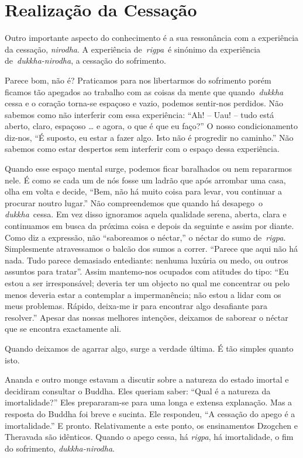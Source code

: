 \section{Realização da Cessação}

Outro importante aspecto do conhecimento é a sua ressonância com a
experiência da cessação, \emph{nirodha}. A experiência de~\emph{rigpa}~é
sinónimo da experiência de~\emph{dukkha-nirodha}, a cessação do
sofrimento.

Parece bom, não é? Praticamos para nos libertarmos do sofrimento porém
ficamos tão apegados ao trabalho com as coisas da mente que
quando~\emph{dukkha} cessa e o coração torna-se espaçoso e vazio,
podemos sentir-nos perdidos. Não sabemos como não interferir com essa
experiência: ``Ah! -- Uau! -- tudo está aberto, claro, espaçoso \ldots{}
e agora, o que é que eu faço?'' O nosso condicionamento diz-nos, ``É
suposto, eu estar a fazer algo. Isto não é progredir no caminho.'' Não
sabemos como estar despertos sem interferir com o espaço dessa
experiência.

Quando esse espaço mental surge, podemos ficar baralhados ou nem
repararmos nele. É como se cada um de nós fosse um ladrão que após
arrombar uma casa, olha em volta e decide, ``Bem, não há muito coisa
para levar, vou continuar a procurar noutro lugar.'' Não compreendemos
que quando há desapego~o \emph{dukkha}~cessa. Em vez disso ignoramos
aquela qualidade serena, aberta, clara e continuamos em busca da próxima
coisa e depois da seguinte e assim por diante. Como diz a expressão, não
``saboreamos o néctar,'' o néctar do sumo de~\emph{rigpa}. Simplesmente
atravessamos o balcão dos sumos a correr. ``Parece que aqui não há nada.
Tudo parece demasiado entediante: nenhuma luxúria ou medo, ou outros
assuntos para tratar''. Assim mantemo-nos ocupados com atitudes do tipo:
``Eu estou a ser irresponsável; deveria ter um objecto no qual me
concentrar ou pelo menos deveria estar a contemplar a impermanência; não
estou a lidar com os meus problemas. Rápido, deixa-me ir para encontrar
algo desafiante para resolver.'' Apesar das nossas melhores intenções,
deixamos de saborear o néctar que se encontra exactamente ali.

Quando deixamos de agarrar algo, surge a verdade última. É tão simples
quanto isto.

Ananda e outro monge estavam a discutir sobre a natureza do estado
imortal e decidiram consultar o Buddha. Eles queriam saber: ``Qual é a
natureza da imortalidade?'' Eles prepararam-se para uma longa e extensa
explanação. Mas a resposta do Buddha foi breve e sucinta. Ele respondeu,
``A cessação do apego é a imortalidade.'' E pronto. Relativamente a este
ponto, os ensinamentos Dzogchen e Theravada são idênticos. Quando o
apego cessa, há \emph{rigpa}, há imortalidade, o fim do sofrimento,
\emph{dukkha-nirodha}.


